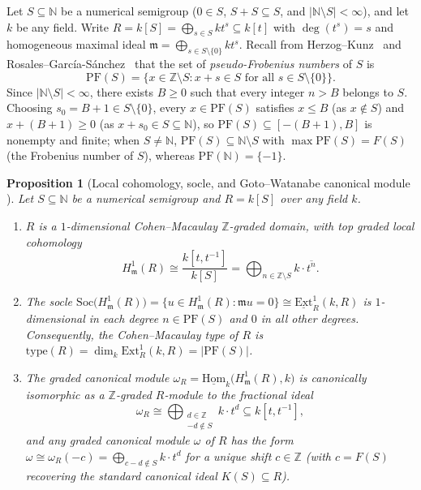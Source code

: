 \documentclass[11pt]{article}
\newtheorem{proposition}[theorem]{Proposition}
\theoremstyle{definition}
\theoremstyle{remark}
\begin{document}
Let $S \subseteq \mathbb{N}$ be a numerical semigroup ($0 \in S$, $S + S \subseteq S$, and $|\mathbb{N} \setminus S| < \infty$), and let $k$ be any field. Write $R = k[S] = \bigoplus_{s \in S} k t^s \subseteq k[t]$ with $\deg(t^s) = s$ and homogeneous maximal ideal $\mathfrak{m} = \bigoplus_{s \in S \setminus \{0\}} k t^s$. Recall from Herzog--Kunz~\cite{HK} and Rosales--Garc\'ia-S\'anchez~\cite[Ch.~2]{RGS} that the set of \emph{pseudo-Frobenius numbers} of $S$ is
\begin{equation}\label{eq:pf-def}
  \mathrm{PF}(S) = \{ x \in \mathbb{Z} \setminus S : x + s \in S \text{ for all } s \in S \setminus \{0\} \}.
\end{equation}
Since $|\mathbb{N} \setminus S| < \infty$, there exists $B \ge 0$ such that every integer $n > B$ belongs to $S$. Choosing $s_0 = B + 1 \in S \setminus \{0\}$, every $x \in \mathrm{PF}(S)$ satisfies $x \le B$ (as $x \notin S$) and $x + (B + 1) \ge 0$ (as $x + s_0 \in S \subseteq \mathbb{N}$), so $\mathrm{PF}(S) \subseteq [-(B+1), B]$ is nonempty and finite; when $S \ne \mathbb{N}$, $\mathrm{PF}(S) \subseteq \mathbb{N} \setminus S$ with $\max \mathrm{PF}(S) = F(S)$ (the Frobenius number of $S$), whereas $\mathrm{PF}(\mathbb{N}) = \{-1\}$.

\begin{proposition}[Local cohomology, socle, and Goto--Watanabe canonical module {\cite{GW1,GW2,BH}}]\label{prop:local-duality}
Let $S \subseteq \mathbb{N}$ be a numerical semigroup and $R = k[S]$ over any field $k$.
\begin{enumerate}
  \item[(a)] $R$ is a $1$-dimensional Cohen--Macaulay $\mathbb{Z}$-graded domain, with top graded local cohomology
  \[
    H^1_{\mathfrak{m}}(R) \cong \frac{k[t, t^{-1}]}{k[S]} = \bigoplus_{n \in \mathbb{Z} \setminus S} k \cdot \overline{t^n}.
  \]
  \item[(b)] The socle $\mathrm{Soc}\bigl(H^1_{\mathfrak{m}}(R)\bigr) = \{ u \in H^1_{\mathfrak{m}}(R) : \mathfrak{m} u = 0 \} \cong \underline{\mathrm{Ext}}^1_R(k, R)$ is $1$-dimensional in each degree $n \in \mathrm{PF}(S)$ and $0$ in all other degrees. Consequently, the Cohen--Macaulay type of $R$ is $\mathrm{type}(R) = \dim_k \mathrm{Ext}^1_R(k, R) = |\mathrm{PF}(S)|$.
  \item[(c)] The graded canonical module $\omega_R = \underline{\mathrm{Hom}}_k\bigl(H^1_{\mathfrak{m}}(R), k\bigr)$ is canonically isomorphic as a $\mathbb{Z}$-graded $R$-module to the fractional ideal
  \[
    \omega_R \cong \bigoplus_{\substack{d \in \mathbb{Z} \\ -d \notin S}} k \cdot t^d \subseteq k[t, t^{-1}],
  \]
  and any graded canonical module $\omega$ of $R$ has the form $\omega \cong \omega_R(-c) = \bigoplus_{c - d \notin S} k \cdot t^d$ for a unique shift $c \in \mathbb{Z}$ (with $c = F(S)$ recovering the standard canonical ideal $K(S) \subseteq R$).
\end{enumerate}
\end{proposition}
\end{document}
